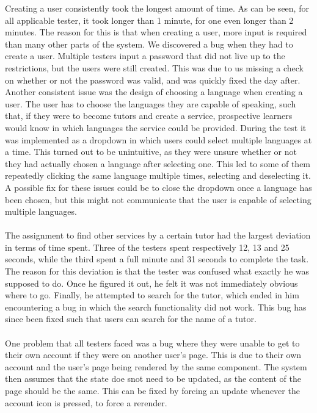 Creating a user consistently took the longest amount of time.
As can be seen, for all applicable tester, it took longer than 1 minute, for one even longer than 2 minutes.
The reason for this is that when creating a user, more input is required than many other parts of the system.
We discovered a bug when they had to create a user. 
Multiple testers input a password that did not live up to the restrictions, but the users were still created. 
This was due to us missing a check on whether or not the password was valid, and was quickly fixed the day after.
Another consistent issue was the design of choosing a language when creating a user.
The user has to choose the languages they are capable of speaking, such that, if they were to become tutors and create a service, prospective learners would know in which languages the service could be provided.
During the test it was implemented as a dropdown in which users could select multiple languages at a time.
This turned out to be unintuitive, as they were unsure whether or not they had actually chosen a language after selecting one.
This led to some of them repeatedly clicking the same language multiple times, selecting and deselecting it.
A possible fix for these issues could be to close the dropdown once a language has been chosen, but this might not communicate that the user is capable of selecting multiple languages.
\\\\
The assignment to find other services by a certain tutor had the largest deviation in terms of time spent.
Three of the testers spent respectively 12, 13 and 25 seconds, while the third spent a full minute and 31 seconds to complete the task.
The reason for this deviation is that the tester was confused what exactly he was supposed to do.
Once he figured it out, he felt it was not immediately obvious where to go.
Finally, he attempted to search for the tutor, which ended in him encountering a bug in which the search functionality did not work.
This bug has since been fixed such that users can search for the name of a tutor.
\\\\
One problem that all testers faced was a bug where they were unable to get to their own account if they were on another user's page.
This is due to their own account and the user's page being rendered by the same component.
The system then assumes that the state doe snot need to be updated, as the content of the page should be the same.
This can be fixed by forcing an update whenever the account icon is pressed, to force a rerender.
